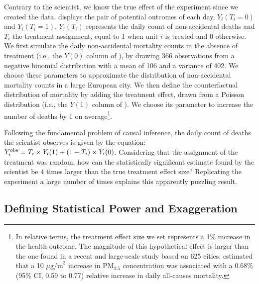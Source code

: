\documentclass[12pt]{article}
\begin{document}
    Contrary to the scientist, we know the true effect of the experiment since we created the data.  displays the pair of potential outcomes of each day, $Y_{i}(T_{i}=0)$ and $Y_{i}(T_{i}=1)$. $Y_{i}(T_{i})$ represents the daily count of non-accidental deaths and $T_{i}$ the treatment assignment, equal to 1 when unit $i$ is treated and 0 otherwise. We first simulate the daily non-accidental mortality counts in the absence of treatment (i.e., the $Y(0)$ column of ), by drawing 366 observations from a negative binomial distribution with a mean of 106 and a variance of 402. We choose these parameters to approximate the distribution of non-accidental mortality counts in a large European city. We then define the counterfactual distribution of mortality by adding the treatment effect, drawn from a Poisson distribution (i.e., the $Y(1)$ column of ). We choose its parameter to increase the number of deaths by 1 on average\footnote{In relative terms, the treatment effect size we set represents a 1\% increase in the health outcome. The magnitude of this hypothetical effect is larger than the one found in a recent and large-scale study based on 625 cities. \cite{liu_ambient_2019} estimated that a 10 $\mu \text{g/m}^3$ increase in $\text{PM}_{2.5}$ concentration was associated with a 0.68\% (95\% CI, 0.59 to 0.77) relative increase in daily all-causes mortality.}.

    

    Following the fundamental problem of causal inference, the daily count of deaths the scientist observes is given by the equation: $Y_{i}^{\textnormal{obs}} = T_{i} \times Y_{i}(1) + (1-T_{i})\times Y_{i}(0)$. Considering that the assignment of the treatment was random, how can the statistically significant estimate found by the scientist be 4 times larger than the true treatment effect size? Replicating the experiment a large number of times explains this apparently puzzling result.
   
        \begin{sloppypar}
    \subsection{Defining Statistical Power and Exaggeration}
        \end{sloppypar}
\end{document}
